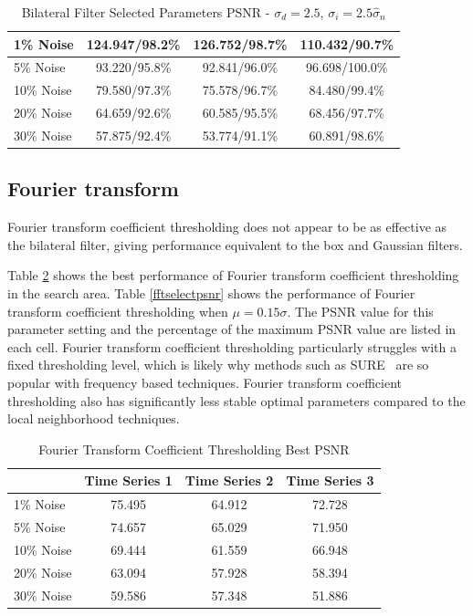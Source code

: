 \documentclass[11pt]{article}
\theoremstyle{definition}
\begin{document}
\begin{table}[!h]
\small
\begin{center}
\begin{tabular}{lccc}
\hline 
1\% Noise & 124.947/98.2\% & 126.752/98.7\% & 110.432/90.7\% \\ \hline
5\% Noise & 93.220/95.8\% & 92.841/96.0\% & 96.698/100.0\% \\ \hline
10\% Noise & 79.580/97.3\% & 75.578/96.7\% & 84.480/99.4\% \\ \hline
20\% Noise & 64.659/92.6\% & 60.585/95.5\% & 68.456/97.7\% \\ \hline
30\% Noise & 57.875/92.4\% & 53.774/91.1\% & 60.891/98.6\% \\ \hline
\end{tabular}
\caption{Bilateral Filter Selected Parameters PSNR - $\sigma_d = 2.5$, $\sigma_i = 2.5 \hat{\sigma}_n$}
\label{bilateralselectpsnr}
\end{center}
\end{table}

\subsection{Fourier transform} 
Fourier transform coefficient thresholding does not appear to be as
effective as the bilateral filter, giving performance equivalent to
the box and Gaussian filters.

Table \ref{fftbestpsnr} shows the best performance of Fourier
transform coefficient thresholding in the search area. Table
\ref{fftselectpsnr} shows the performance of Fourier transform
coefficient thresholding when $\mu = 0.15 \sigma$. The PSNR value for
this parameter setting and the percentage of the maximum PSNR value
are listed in each cell. Fourier transform coefficient thresholding
particularly struggles with a fixed thresholding level, which is
likely why methods such as SURE~\cite{Rangarajan02} are so popular
with frequency based techniques. Fourier transform coefficient
thresholding also has significantly less stable optimal parameters
compared to the local neighborhood techniques.

\begin{table}[!h]
\small
\begin{center}
\begin{tabular}{lccc}
\hline 
 & Time Series 1 & Time Series 2 & Time Series 3 \\ \hline
1\% Noise & 75.495 & 64.912 & 72.728 \\ \hline
5\% Noise & 74.657 & 65.029 & 71.950 \\ \hline
10\% Noise & 69.444 & 61.559 & 66.948 \\ \hline
20\% Noise & 63.094 & 57.928 & 58.394 \\ \hline
30\% Noise & 59.586 & 57.348 & 51.886 \\ \hline
\end{tabular}
\caption{Fourier Transform Coefficient Thresholding Best PSNR}
\label{fftbestpsnr}
\end{center}
\end{table}
\end{document}
